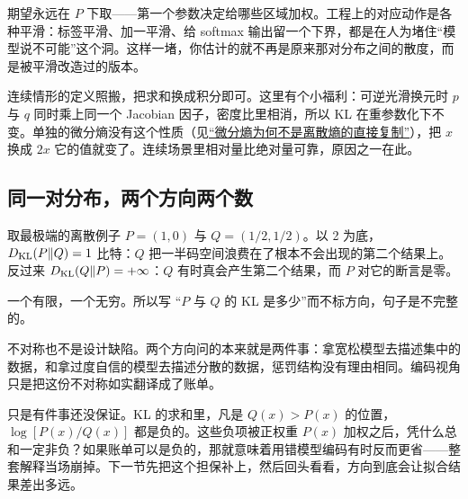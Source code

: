 期望永远在 \(P\) 下取——第一个参数决定给哪些区域加权。工程上的对应动作是各种平滑：标签平滑、加一平滑、给 softmax 输出留一个下界，都是在人为堵住``模型说不可能''这个洞。这样一堵，你估计的就不再是原来那对分布之间的散度，而是被平滑改造过的版本。

连续情形的定义照搬，把求和换成积分即可。这里有个小福利：可逆光滑换元时 \(p\) 与 \(q\) 同时乘上同一个 Jacobian 因子，密度比里相消，所以 KL 在重参数化下不变。单独的微分熵没有这个性质（见\hyperref[sec:07-Information-Theory/01-Information-and-Entropy/03]{``微分熵为何不是离散熵的直接复制''}），把 \(x\) 换成 \(2x\) 它的值就变了。连续场景里相对量比绝对量可靠，原因之一在此。

\subsection{同一对分布，两个方向两个数}

取最极端的离散例子 \(P=(1,0)\) 与 \(Q=(1/2,1/2)\)。以 2 为底，\(D_{\mathrm{KL}}(P\|Q)=1\) 比特：\(Q\) 把一半码空间浪费在了根本不会出现的第二个结果上。反过来 \(D_{\mathrm{KL}}(Q\|P)=+\infty\)：\(Q\) 有时真会产生第二个结果，而 \(P\) 对它的断言是零。

一个有限，一个无穷。所以写 ``\(P\) 与 \(Q\) 的 KL 是多少''而不标方向，句子是不完整的。

不对称也不是设计缺陷。两个方向问的本来就是两件事：拿宽松模型去描述集中的数据，和拿过度自信的模型去描述分散的数据，惩罚结构没有理由相同。编码视角只是把这份不对称如实翻译成了账单。

只是有件事还没保证。KL 的求和里，凡是 \(Q(x)>P(x)\) 的位置，\(\log[P(x)/Q(x)]\) 都是负的。这些负项被正权重 \(P(x)\) 加权之后，凭什么总和一定非负？如果账单可以是负的，那就意味着用错模型编码有时反而更省——整套解释当场崩掉。下一节先把这个担保补上，然后回头看看，方向到底会让拟合结果差出多远。
